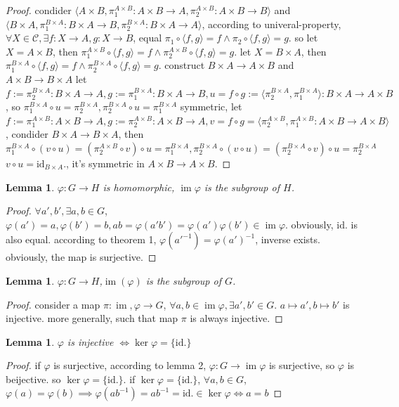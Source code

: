 \documentclass[10pt,a4paper]{article}
\newtheorem{lemma}[theorem]{Lemma}
\begin{document}
\begin{proof}
    condider $\langle A\times B,\pi_1^{A\times B}:A\times B\to A,\pi_2^{A\times B}:A\times B\to B\rangle$ and
    $\langle B\times A,\pi_1^{B\times A}:B\times A\to B,\pi_2^{B\times A}:B\times A\to A\rangle$, according to univeral-property,
    $\forall X\in\mathcal C,\exists f:X\to A,g:X\to B$, equal $\pi_1\circ\langle f,g\rangle=f\land\pi_2\circ\langle f,g\rangle=g$.
    so let $X=A\times B$, then $\pi_1^{A\times B}\circ\langle f,g\rangle=f\land\pi_2^{A\times B}\circ\langle f,g\rangle=g$.
    let $X=B\times A$, then $\pi_1^{B\times A}\circ\langle f,g\rangle=f\land\pi_2^{B\times A}\circ\langle f,g\rangle=g$.
    construct $B\times A\to A\times B$ and $A\times B\to B\times A$
    let $f:=\pi_2^{B\times A}:B\times A\to A,g:=\pi_1^{B\times A}:B\times A\to B,u=f\circ g:=\langle\pi_2^{B\times A},\pi_1^{B\times A}\rangle:B\times A\to A\times B$,
    so $\pi_1^{B\times A}\circ u=\pi_2^{B\times A},\pi_2^{B\times A}\circ u=\pi_1^{B\times A}$
    symmetric, let $f:=\pi_1^{A\times B}:A\times B\to A,g:=\pi_2^{A\times B}:A\times B\to A,v=f\circ g=\langle\pi_2^{A\times B},\pi_1^{A\times B}:A\times B\to A\times B\rangle$,
    condider $B\times A\to B\times A$, then $\pi_1^{B\times A}\circ(v\circ u)=(\pi_2^{A\times B}\circ v)\circ u=\pi_1^{B\times A},\pi_2^{B\times A}\circ(v\circ u)=(\pi_2^{B\times A}\circ v)\circ u=\pi_2^{B\times A}$
    $v\circ u=\mathrm{id}_{B\times A}.$, it's symmetric in $A\times B\to A\times B$.
\end{proof}
\begin{lemma}
    $\varphi:G\to H$ is homomorphic, $\operatorname{im}\varphi$ is the subgroup of $H$.
\end{lemma}
\begin{proof}
    $\forall a',b'\operatorname,\exists a,b\in G$, $\varphi(a')=a,\varphi(b')=b,ab=\varphi(a'b')=\varphi(a')\varphi(b')\in\operatorname{im}\varphi$. obviously, $\mathrm{id.}$ is also equal.
    according to theorem 1, $\varphi(a'^{-1})=\varphi(a')^{-1}$, inverse exists. obviously, the map is surjective.
\end{proof}
\begin{lemma}
    $\varphi:G\to H$,$\operatorname{im}(\varphi)$ is the subgroup of $G$.
\end{lemma}
\begin{proof}
   consider a map $\pi:\operatorname{im},\varphi\to G$, $\forall a,b\in\operatorname{im}\varphi,\exists a',b'\in G$. $a\mapsto a',b\mapsto b'$ is injective. more generally, such that map $\pi$ is always injective. 
\end{proof}
\begin{lemma}
    $\varphi$ is injective $\iff\ker\varphi=\{\mathrm{id.}\}$
\end{lemma}
\begin{proof}
    if $\varphi$ is surjective, according to lemma 2, $\varphi:G\to\operatorname{im}\varphi$ is surjective, so $\varphi$ is beijective.
    so $\ker\varphi=\{\mathrm{id.}\}$. if $\ker\varphi=\{\mathrm{id.}\}$, $\forall a,b\in G$, $\varphi(a)=\varphi(b)\implies\varphi(ab^{-1})=ab^{-1}=\mathrm{id.}\in\ker\varphi\iff a=b$
\end{proof}
\end{document}
